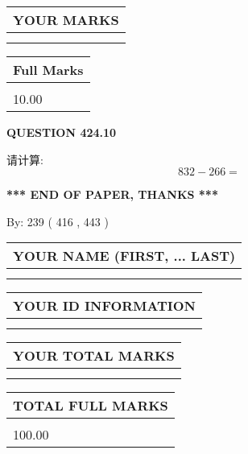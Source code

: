 \documentclass{ctexart}
\begin{document}
\vspace{0.2in}
  
\noindent\begin{tabular}{|l|}
\hline
 YOUR MARKS  \\
\hline
 \\ 
 \\ 
\hline
\end{tabular}
\hspace{0.05in} \begin{tabular}{|l|}
\hline
 Full Marks  \\
\hline
 \\ 
10.00 \\
\hline
\end{tabular}
{\textbf{\Large{QUESTION
424.10 
}}}
  
  
 
请计算:
\begin{equation}
832 -   %
266 = \nonumber
\end{equation}
 

 

 
   
   
 \vspace{0.2in}
 
   
   
   
   
\vspace{1.0in} 
{\textbf{\large{ *** END OF PAPER, THANKS *** }}} 
   
   
\hspace{1.0in} By: 
 239 ( 416 ,  443 )
   
   
   
   
\newpage 
\setcounter{page}{ 
   425001 } 
   
   
   
   
\noindent\begin{tabular}{|l|}
\hline
YOUR NAME (FIRST, ... LAST)  \\
\hline
 \\ 
 \\ 
\hline
\end{tabular}
\hspace{0.05in} \begin{tabular}{|l|}
\hline
 YOUR   ID   INFORMATION  \\
\hline
 \\ 
 \\ 
\hline
\end{tabular}
   
   
\vspace{0.2in}\noindent\begin{tabular}{|l|}
\hline
YOUR TOTAL MARKS  \\
\hline
 \\ 
 \\ 
\hline
\end{tabular}
\hspace{0.05in} \begin{tabular}{|l|}
\hline
TOTAL FULL MARKS  \\
\hline
 \\ 
100.00 \\
\hline
\end{tabular}
   
\end{document}

